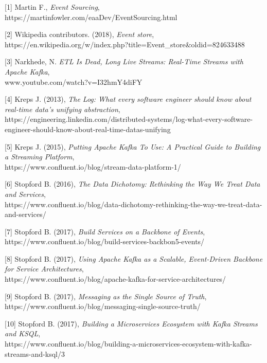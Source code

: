 \documentclass[]{article}
\begin{document}
\small
[1] Martin F., \emph{Event Sourcing},\\
https://martinfowler.com/eaaDev/EventSourcing.html

{[}2{]} Wikipedia contributors. (2018), \emph{Event store},\\
https://en.wikipedia.org/w/index.php?title=Event\_store\&oldid=824633488

{[}3{]} Narkhede, N. \emph{ETL Is Dead, Long Live Streams: Real-Time
Streams with Apache Kafka},\\
www.youtube.com/watch?v=I32hmY4diFY

{[}4{]} Kreps J. (2013), \emph{The Log: What every software engineer
should know about real-time data's unifying abstraction},\\
https://engineering.linkedin.com/distributed-systems/log-what-every-software-engineer-should-know-about-real-time-datas-unifying

{[}5{]} Kreps J. (2015), \emph{Putting Apache Kafka To Use: A Practical
Guide to Building a Streaming Platform},\\
https://www.confluent.io/blog/stream-data-platform-1/

{[}6{]} Stopford B. (2016), \emph{The Data Dichotomy: Rethinking the Way
We Treat Data and Services},\\
https://www.confluent.io/blog/data-dichotomy-rethinking-the-way-we-treat-data-and-services/

{[}7{]} Stopford B. (2017), \emph{Build Services on a Backbone of
Events},\\
https://www.confluent.io/blog/build-services-backbon5-events/

{[}8{]} Stopford B. (2017), \emph{Using Apache Kafka as a Scalable,
Event-Driven Backbone for Service Architectures},\\
https://www.confluent.io/blog/apache-kafka-for-service-architectures/

{[}9{]} Stopford B. (2017), \emph{Messaging as the Single Source of
Truth},\\
https://www.confluent.io/blog/messaging-single-source-truth/

{[}10{]} Stopford B. (2017), \emph{Building a Microservices Ecosystem
with Kafka Streams and KSQL},\\
https://www.confluent.io/blog/building-a-microservices-ecosystem-with-kafka-streams-and-ksql/3
\end{document}

